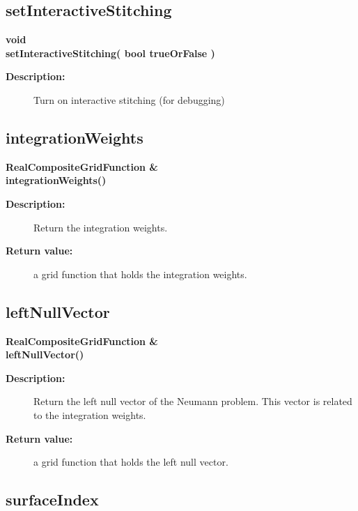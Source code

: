 \subsection{setInteractiveStitching}
 
\begin{flushleft} \textbf{%
void  \\ 
\settowidth{\IntegrateIncludeArgIndent}{setInteractiveStitching(}%
setInteractiveStitching( bool trueOrFalse )
}\end{flushleft}
\begin{description}
\item[{\bf Description:}] 
     Turn on interactive stitching (for debugging)
\end{description}
\subsection{integrationWeights}
 
\begin{flushleft} \textbf{%
RealCompositeGridFunction \&  \\ 
\settowidth{\IntegrateIncludeArgIndent}{integrationWeights(}%
integrationWeights()
}\end{flushleft}
\begin{description}
\item[{\bf Description:}] 
    Return the integration weights.
\item[{\bf Return value:}]  a grid function that holds the integration weights. 
\end{description}
\subsection{leftNullVector}
 
\begin{flushleft} \textbf{%
RealCompositeGridFunction \&  \\ 
\settowidth{\IntegrateIncludeArgIndent}{leftNullVector(}%
leftNullVector()
}\end{flushleft}
\begin{description}
\item[{\bf Description:}] 
    Return the left null vector of the Neumann problem. This vector is related to the
 integration weights.
\item[{\bf Return value:}]  a grid function that holds the left null vector.
\end{description}
\subsection{surfaceIndex}
 
